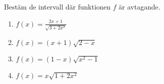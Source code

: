 


Bestäm de intervall där funktionen $f$ är avtagande.
\begin{enumerate}
\item $ f(x) =  \frac{2x+1}{\sqrt{3+2x^2}} $
\item $ f(x) =  (x+1)\sqrt{2-x} $
\item $ f(x) =  (1-x)\sqrt{x^2-1} $
\item $ f(x) =  x\sqrt{1+2x^2} $
\end{enumerate}